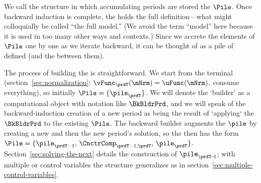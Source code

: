 We call the structure in which accumulating periods are stored the {\pileName} $\Pile$. Once backward induction is complete, the {\pileName} holds the full definition---what might colloquially be called ``the full model.''  (We avoid the term ``model'' here because it is used in too many other ways and contexts.)  Since we accrete the elements of $\Pile$ one by one as we iterate backward, it can be thought of as a pile of defined {\intervals} (and the {\Cncts} between them).

The process of building the {\pileName} is straightforward.  We start from the terminal {\interval} (section~\ref{sec:normalization}: $\vFunc_{\prdT}(\mNrm) = \uFunc(\mNrm)$, consume everything), so initially $\Pile = \{\pile_{\prdT}\}$.  We will denote the `builder' as a computational object with notation like $\BkBldrPrd$, and we will speak of the backward-induction creation of a new period as being the result of `applying` the $\BkBldrPrd$ to the existing $\Pile$.  The backward builder augments the $\pile$ by creating a new {\Cnct} and then the new period's solution, so the {\pileName} then has the form $\Pile = \{\pile_{\prdT-1},\, \CnctrComp_{\prdT-1,\prdT},\, \pile_{\prdT}\}$.  Section~\ref{sec:solving-the-next} details the construction of $\pile_{\prdT\!-\!1}$; with multiple {\stgs} or control variables the structure generalizes as in section~\ref{sec:multiple-control-variables}.

